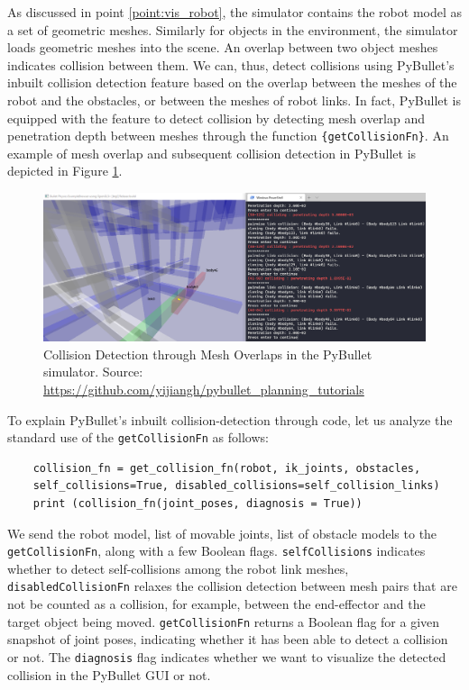 As discussed in point \ref{point:vis_robot}, the simulator contains the robot model as a set of geometric meshes. Similarly for objects in the environment, the simulator loads geometric meshes into the scene. An overlap between two object meshes indicates collision between them. We can, thus, detect collisions using PyBullet's inbuilt collision detection feature based on the overlap between the meshes of the robot and the obstacles, or between the meshes of robot links. In fact, PyBullet is equipped with the feature to detect collision by detecting mesh overlap and penetration depth between meshes through the function \verb_{getCollisionFn}_. An example of mesh overlap and subsequent collision detection in PyBullet is depicted in Figure \ref{fig:collisions-pybullet}.

\begin{figure}[ht]
    \centering
    \includegraphics[scale=0.3]{figures/bl-manipulator/assembly_collision.png}
    \caption[Collision detection through Mesh Overlap]{Collision Detection through Mesh Overlaps in the PyBullet simulator. Source:  \scriptsize{\url{https://github.com/yijiangh/pybullet_planning_tutorials}}}
    \label{fig:collisions-pybullet}
\end{figure}

To explain PyBullet's inbuilt collision-detection through code, let us analyze the standard use of the \verb_getCollisionFn_ as follows:

\begin{verbatim}
    collision_fn = get_collision_fn(robot, ik_joints, obstacles, 
    self_collisions=True, disabled_collisions=self_collision_links)
    print (collision_fn(joint_poses, diagnosis = True))
\end{verbatim}

We send the robot model, list of movable joints, list of obstacle models to the \verb_getCollisionFn_, along with a few Boolean flags. \verb_selfCollisions_ indicates whether to detect self-collisions among the robot link meshes, \verb_disabledCollisionFn_ relaxes the collision detection between mesh pairs that are not be counted as a collision, for example, between the end-effector and the target object being moved. \verb_getCollisionFn_ returns a Boolean flag for a given snapshot of joint poses, indicating whether it has been able to detect a collision or not. The \verb_diagnosis_ flag indicates whether we want to visualize the detected collision in the PyBullet GUI or not.

